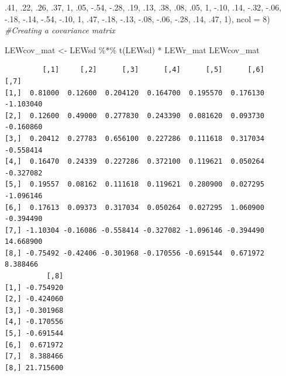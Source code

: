 \documentclass[
]{book}
\newenvironment{Shaded}{\begin{snugshade}}{\end{snugshade}}
\newcommand{\AttributeTok}[1]{\textcolor[rgb]{0.77,0.63,0.00}{#1}}
\newcommand{\CommentTok}[1]{\textcolor[rgb]{0.56,0.35,0.01}{\textit{#1}}}
\newcommand{\DecValTok}[1]{\textcolor[rgb]{0.00,0.00,0.81}{#1}}
\newcommand{\FunctionTok}[1]{\textcolor[rgb]{0.00,0.00,0.00}{#1}}
\newcommand{\NormalTok}[1]{#1}
\newcommand{\OtherTok}[1]{\textcolor[rgb]{0.56,0.35,0.01}{#1}}
\newcommand{\SpecialCharTok}[1]{\textcolor[rgb]{0.00,0.00,0.00}{#1}}
\begin{document}
\begin{Shaded}
\begin{Highlighting}[]
\NormalTok{        .}\DecValTok{41}\NormalTok{, .}\DecValTok{22}\NormalTok{, .}\DecValTok{26}\NormalTok{, .}\DecValTok{37}\NormalTok{, }\DecValTok{1}\NormalTok{, .}\DecValTok{05}\NormalTok{, }\SpecialCharTok{{-}}\NormalTok{.}\DecValTok{54}\NormalTok{, }\SpecialCharTok{{-}}\NormalTok{.}\DecValTok{28}\NormalTok{, }
\NormalTok{        .}\DecValTok{19}\NormalTok{, .}\DecValTok{13}\NormalTok{, .}\DecValTok{38}\NormalTok{, .}\DecValTok{08}\NormalTok{, .}\DecValTok{05}\NormalTok{, }\DecValTok{1}\NormalTok{, }\SpecialCharTok{{-}}\NormalTok{.}\DecValTok{10}\NormalTok{, .}\DecValTok{14}\NormalTok{, }
        \SpecialCharTok{{-}}\NormalTok{.}\DecValTok{32}\NormalTok{, }\SpecialCharTok{{-}}\NormalTok{.}\DecValTok{06}\NormalTok{, }\SpecialCharTok{{-}}\NormalTok{.}\DecValTok{18}\NormalTok{, }\SpecialCharTok{{-}}\NormalTok{.}\DecValTok{14}\NormalTok{, }\SpecialCharTok{{-}}\NormalTok{.}\DecValTok{54}\NormalTok{, }\SpecialCharTok{{-}}\NormalTok{.}\DecValTok{10}\NormalTok{, }\DecValTok{1}\NormalTok{, .}\DecValTok{47}\NormalTok{,}
        \SpecialCharTok{{-}}\NormalTok{.}\DecValTok{18}\NormalTok{, }\SpecialCharTok{{-}}\NormalTok{.}\DecValTok{13}\NormalTok{, }\SpecialCharTok{{-}}\NormalTok{.}\DecValTok{08}\NormalTok{, }\SpecialCharTok{{-}}\NormalTok{.}\DecValTok{06}\NormalTok{, }\SpecialCharTok{{-}}\NormalTok{.}\DecValTok{28}\NormalTok{, .}\DecValTok{14}\NormalTok{, .}\DecValTok{47}\NormalTok{, }\DecValTok{1}\NormalTok{), }\AttributeTok{ncol =} \DecValTok{8}\NormalTok{)}
\CommentTok{\#Creating a covariance matrix}

\NormalTok{LEWcov\_mat }\OtherTok{\textless{}{-}}\NormalTok{ LEWsd }\SpecialCharTok{\%*\%} \FunctionTok{t}\NormalTok{(LEWsd) }\SpecialCharTok{*}\NormalTok{ LEWr\_mat}
\NormalTok{LEWcov\_mat}
\end{Highlighting}
\end{Shaded}

\begin{verbatim}
         [,1]     [,2]      [,3]      [,4]      [,5]      [,6]      [,7]
[1,]  0.81000  0.12600  0.204120  0.164700  0.195570  0.176130 -1.103040
[2,]  0.12600  0.49000  0.277830  0.243390  0.081620  0.093730 -0.160860
[3,]  0.20412  0.27783  0.656100  0.227286  0.111618  0.317034 -0.558414
[4,]  0.16470  0.24339  0.227286  0.372100  0.119621  0.050264 -0.327082
[5,]  0.19557  0.08162  0.111618  0.119621  0.280900  0.027295 -1.096146
[6,]  0.17613  0.09373  0.317034  0.050264  0.027295  1.060900 -0.394490
[7,] -1.10304 -0.16086 -0.558414 -0.327082 -1.096146 -0.394490 14.668900
[8,] -0.75492 -0.42406 -0.301968 -0.170556 -0.691544  0.671972  8.388466
          [,8]
[1,] -0.754920
[2,] -0.424060
[3,] -0.301968
[4,] -0.170556
[5,] -0.691544
[6,]  0.671972
[7,]  8.388466
[8,] 21.715600
\end{verbatim}
\end{document}
